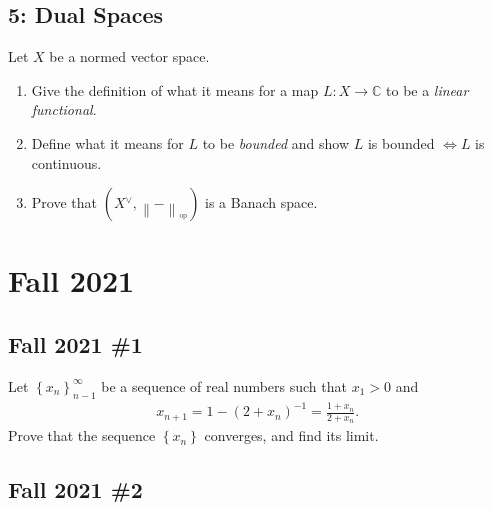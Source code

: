 \hypertarget{dual-spaces}{%
\subsection{5: Dual Spaces}\label{dual-spaces}}

Let \(X\) be a normed vector space.

\begin{enumerate}
\def\labelenumi{\alph{enumi}.}
\item
  Give the definition of what it means for a map \(L:X\to {\mathbb{C}}\)
  to be a \emph{linear functional}.
\item
  Define what it means for \(L\) to be \emph{bounded} and show \(L\) is
  bounded \(\iff L\) is continuous.
\item
  Prove that
  \((X {}^{ \vee }, {\left\lVert {{-}} \right\rVert}_{^{\operatorname{op}}})\)
  is a Banach space.
\end{enumerate}

\hypertarget{fall-2021}{%
\section{Fall 2021}\label{fall-2021}}

\hypertarget{fall-2021-1}{%
\subsection{Fall 2021 \#1}\label{fall-2021-1}}

Let \(\left\{x_{n}\right\}_{n-1}^{\infty}\) be a sequence of real
numbers such that \(x_{1}>0\) and
\begin{align*}
x_{n+1}=1-\left(2+x_{n}\right)^{-1}=\frac{1+x_{n}}{2+x_{n}} \text {. }
\end{align*}
Prove that the sequence \(\left\{x_{n}\right\}\) converges, and find its
limit.

\hypertarget{fall-2021-2}{%
\subsection{Fall 2021 \#2}\label{fall-2021-2}}

